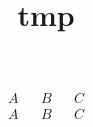 
\title{tmp}
\usepackage{cancel}



\begin{align*}
	A & & B & & C \\
	A & & B & & C
\end{align*}



